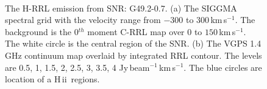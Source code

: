 \documentclass[manuscript]{aastex61}
\newcommand{\hii}{{\rm H\,}{{\sc ii}}}
\newcommand{\kms}{\,km\,s$^{-1}$}
\begin{document}
\begin{figure}[H]
\centering
{}
\\
\caption{The H-RRL emission from SNR: G49.2-0.7.
          (a) The SIGGMA spectral grid with the velocity range from $-300$ to $300$\kms.
	  The background is the 0$^{th}$ moment C-RRL map over $0$ to $150$\kms.
	  The white circle is the central region of the SNR.
	  (b) The VGPS 1.4 GHz continuum map overlaid by integrated RRL contour.
	  The levels are 0.5, 1, 1.5, 2, 2.5, 3, 3.5, 4 Jy\,beam$^{-1}$\kms.
	  The blue circles are location of a \hii\ regions.
	  }
\label{fig_snr-g492}
\end{figure}
\end{document}
